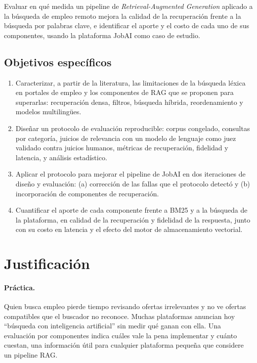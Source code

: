 Evaluar en qué medida un pipeline de \textit{Retrieval-Augmented Generation} aplicado a la búsqueda de empleo remoto mejora la calidad de la recuperación frente a la búsqueda por palabras clave, e identificar el aporte y el costo de cada uno de sus componentes, usando la plataforma JobAI como caso de estudio.

\subsection{Objetivos específicos}

\begin{enumerate}
    \item Caracterizar, a partir de la literatura, las limitaciones de la búsqueda léxica en portales de empleo y los componentes de RAG que se proponen para superarlas: recuperación densa, filtros, búsqueda híbrida, reordenamiento y modelos multilingües.
    \item Diseñar un protocolo de evaluación reproducible: corpus congelado, consultas por categoría, juicios de relevancia con un modelo de lenguaje como juez validado contra juicios humanos, métricas de recuperación, fidelidad y latencia, y análisis estadístico.
    \item Aplicar el protocolo para mejorar el pipeline de JobAI en dos iteraciones de diseño y evaluación: (a) corrección de las fallas que el protocolo detectó y (b) incorporación de componentes de recuperación.
    \item Cuantificar el aporte de cada componente frente a BM25 y a la búsqueda de la plataforma, en calidad de la recuperación y fidelidad de la respuesta, junto con su costo en latencia y el efecto del motor de almacenamiento vectorial.
\end{enumerate}

\section{Justificación}

\paragraph{Práctica.} Quien busca empleo pierde tiempo revisando ofertas irrelevantes y no ve ofertas compatibles que el buscador no reconoce. Muchas plataformas anuncian hoy \enquote{búsqueda con inteligencia artificial} sin medir qué ganan con ella. Una evaluación por componentes indica cuáles vale la pena implementar y cuánto cuestan, una información útil para cualquier plataforma pequeña que considere un pipeline RAG.

